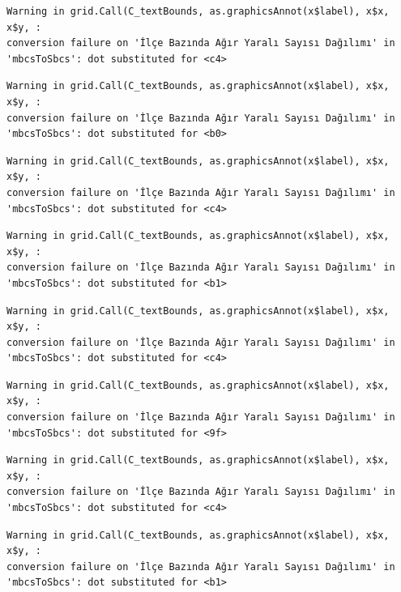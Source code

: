 \documentclass[
  11pt,
  a4paper,
  DIV=11,
  numbers=noendperiod]{scrartcl}
\begin{document}
\begin{verbatim}
Warning in grid.Call(C_textBounds, as.graphicsAnnot(x$label), x$x, x$y, :
conversion failure on 'İlçe Bazında Ağır Yaralı Sayısı Dağılımı' in
'mbcsToSbcs': dot substituted for <c4>
\end{verbatim}

\begin{verbatim}
Warning in grid.Call(C_textBounds, as.graphicsAnnot(x$label), x$x, x$y, :
conversion failure on 'İlçe Bazında Ağır Yaralı Sayısı Dağılımı' in
'mbcsToSbcs': dot substituted for <b0>
\end{verbatim}

\begin{verbatim}
Warning in grid.Call(C_textBounds, as.graphicsAnnot(x$label), x$x, x$y, :
conversion failure on 'İlçe Bazında Ağır Yaralı Sayısı Dağılımı' in
'mbcsToSbcs': dot substituted for <c4>
\end{verbatim}

\begin{verbatim}
Warning in grid.Call(C_textBounds, as.graphicsAnnot(x$label), x$x, x$y, :
conversion failure on 'İlçe Bazında Ağır Yaralı Sayısı Dağılımı' in
'mbcsToSbcs': dot substituted for <b1>
\end{verbatim}

\begin{verbatim}
Warning in grid.Call(C_textBounds, as.graphicsAnnot(x$label), x$x, x$y, :
conversion failure on 'İlçe Bazında Ağır Yaralı Sayısı Dağılımı' in
'mbcsToSbcs': dot substituted for <c4>
\end{verbatim}

\begin{verbatim}
Warning in grid.Call(C_textBounds, as.graphicsAnnot(x$label), x$x, x$y, :
conversion failure on 'İlçe Bazında Ağır Yaralı Sayısı Dağılımı' in
'mbcsToSbcs': dot substituted for <9f>
\end{verbatim}

\begin{verbatim}
Warning in grid.Call(C_textBounds, as.graphicsAnnot(x$label), x$x, x$y, :
conversion failure on 'İlçe Bazında Ağır Yaralı Sayısı Dağılımı' in
'mbcsToSbcs': dot substituted for <c4>
\end{verbatim}

\begin{verbatim}
Warning in grid.Call(C_textBounds, as.graphicsAnnot(x$label), x$x, x$y, :
conversion failure on 'İlçe Bazında Ağır Yaralı Sayısı Dağılımı' in
'mbcsToSbcs': dot substituted for <b1>
\end{verbatim}
\end{document}
